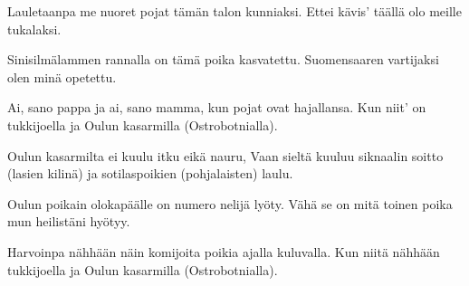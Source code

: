 
\beginverse
Lauletaanpa me nuoret pojat
tämän talon kunniaksi.
Ettei kävis' täällä olo
meille tukalaksi.
\endverse

\beginverse
Sinisilmälammen rannalla
on tämä poika kasvatettu.
Suomensaaren vartijaksi
olen minä opetettu.
\endverse

\beginverse
Ai, sano pappa ja ai, sano mamma,
kun pojat ovat hajallansa.
Kun niit' on tukkijoella
ja Oulun kasarmilla (Ostrobotnialla).
\endverse

\beginverse
Oulun kasarmilta ei kuulu
itku eikä nauru,
Vaan sieltä kuuluu siknaalin soitto (lasien kilinä)
ja sotilaspoikien (pohjalaisten) laulu.
\endverse

\beginverse
Oulun poikain olokapäälle
on numero nelijä lyöty.
Vähä se on mitä toinen poika
mun heilistäni hyötyy.
\endverse

\beginverse
Harvoinpa nähhään näin komijoita poikia
ajalla kuluvalla.
Kun niitä nähhään tukkijoella
ja Oulun kasarmilla (Ostrobotnialla).
\endverse
\endsong